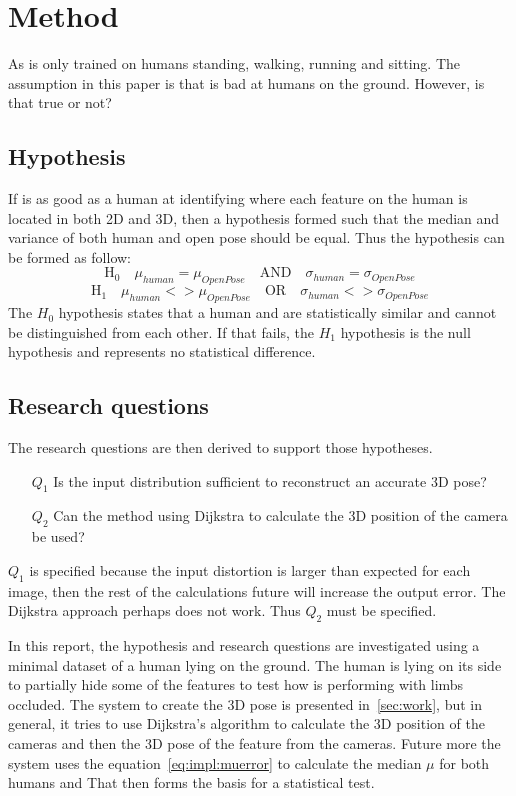 \section{Method}
\label{sec:method}
As \openpose{ } is only trained on humans standing, walking, running and sitting.
The assumption in this paper is that \openpose{ } is bad at humans on the ground.
However, is that true or not?
\subsection{Hypothesis}%
\label{sub:Hypothesis}

If \openpose{ } is as good as a human at identifying where each feature on the human is located in both 2D and 3D, then a hypothesis formed such that the median and variance of both human and open pose should be equal.
Thus the hypothesis can be formed as follow:
$$
\text{H}_0\quad \mu_{human} = \mu_{OpenPose} \quad\text{AND}\quad \sigma_{human} = \sigma_{OpenPose}
$$
$$
\text{H}_1\quad \mu_{human} <> \mu_{OpenPose} \quad\text{OR}\quad \sigma_{human} <> \sigma_{OpenPose}
$$
The $H_0$ hypothesis states that a human and \openpose{ } are statistically similar and cannot be distinguished from each other.
If that fails, the $H_1$ hypothesis is the null hypothesis and represents no statistical difference.

\subsection{Research questions}%
\label{sub:method:research_questions}
The research questions are then derived to support those hypotheses.
\begin{itemize}
    \item[$Q_1$] Is the input distribution sufficient to reconstruct an accurate 3D pose?
    \item[$Q_2$] Can the method using Dijkstra to calculate the 3D position of the camera be used?
\end{itemize}
$Q_1$ is specified because the input distortion is larger than expected for each image, then the rest of the calculations future will increase the output error.
The Dijkstra approach perhaps does not work. Thus $Q_2$ must be specified.

In this report, the hypothesis and research questions are investigated using a minimal dataset of a human lying on the ground.
The human is lying on its side to partially hide some of the features to test how \openpose is performing with limbs occluded.
The system to create the 3D pose is presented in~\ref{sec:work}, but in general, it tries to use Dijkstra's algorithm to calculate the 3D position of the cameras and then the 3D pose of the feature from the cameras.
Future more the system uses the equation~\ref{eq:impl:muerror} to calculate the median $\mu$ for both humans and 
That then forms the basis for a statistical test.



